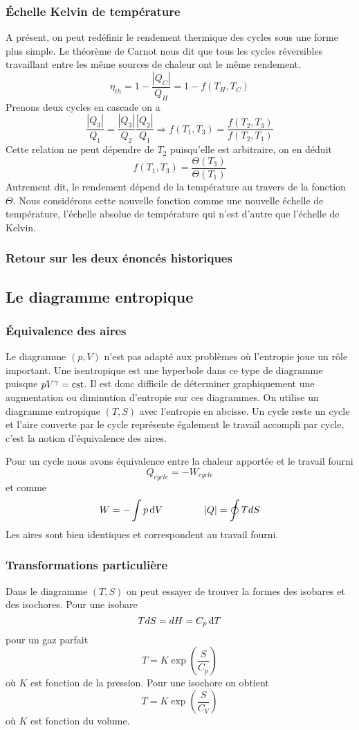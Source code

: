 \subsubsection{Échelle Kelvin de température}
A présent, on peut redéfinir le rendement thermique
des cycles sous une forme plus simple.
Le théorème de Carnot nous dit que tous les cycles réversibles travaillant
entre les même sources de chaleur ont le même rendement.
\[ \eta_{th} = 1-\frac{|Q_C|}{Q_H} = 1-f(T_H,T_C) \]
Prenons deux cycles en cascade on a
\[ \frac{|Q_3|}{Q_1} = \frac{|Q_3|}{Q_2}\frac{|Q_2|}{Q_1}
\Rightarrow f(T_1,T_3) = \frac{f(T_2,T_3)}{f(T_2,T_1)} \]
Cette relation ne peut dépendre de $T_2$ puisqu'elle est arbitraire,
on en déduit
\[ f(T_1,T_3) = \frac{\Theta (T_3)}{\Theta (T_1)} \]
Autrement dit, le rendement dépend de la température
au travers de la fonction $\Theta$.
Nous considérons cette nouvelle fonction comme une
nouvelle échelle de température, l'échelle absolue de température
qui n'est d'autre que l'échelle de Kelvin.

\subsubsection{Retour sur les deux énoncés historiques}

\subsection{Le diagramme entropique}
\subsubsection{Équivalence des aires}
Le diagramme $(p,V)$ n'est pas adapté aux problèmes
où l'entropie joue un rôle important.
Une isentropique est une hyperbole dans ce type
de diagramme puisque $pV^{\gamma} = \mathrm{cst}$.
Il est donc difficile de déterminer graphiquement une
augmentation ou diminution d'entropie sur ces diagrammes.
On utilise un diagramme entropique $(T,S)$ avec l'entropie en abcisse.
Un cycle reste un cycle et l'aire couverte par le cycle représente
également le travail accompli par cycle,
c'est la notion d'équivalence des aires.

Pour un cycle nous avons équivalence entre la chaleur
apportée et le travail fourni
\[ Q_{cycle} = -W_{cycle} \]
et comme
\[ W = -\int p\operatorname{d}\! V \hspace{1.5cm} |Q| = \oint TdS \]
Les aires sont bien identiques et correspondent au travail fourni.

\subsubsection{Transformations particulière}
Dans le diagramme $(T,S)$ on peut essayer de trouver
la formes des isobares et des isochores.
Pour une isobare
\[ TdS = dH = C_p\operatorname{d}\! T \]
pour un gaz parfait
\[ T = K \exp \left(\frac S{C_p}\right) \]
où $K$ est fonction de la pression.
Pour une isochore on obtient
\[ T = K \exp \left(\frac S{C_V}\right) \]
où $K$ est fonction du volume.

